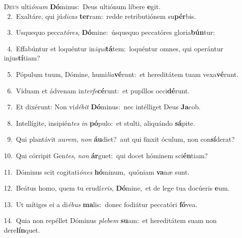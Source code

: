 \lettrine{\initial\textcolor{\initialcolor}{D}}{eus} ulti\-\textit{ó}\-\textit{num} \textbf{Dó}\-minus:~\star Deus ultiónum líbere \textbf{e}\-git.\\
{\numbfont\textcolor{\numbcolor}{~2.}}~Exaltáre, qui jú\-\textit{di}\-\textit{cas} \textbf{ter}\-ram:~\star redde retributiónem su\-\textbf{pér}\-bis.\par
{\numbfont\textcolor{\numbcolor}{~3.}}~Usquequo pecca\-\textit{tó}\-\textit{res}, \textbf{Dó}\-mine:~\star úsquequo peccatóres gloria\-\textbf{bún}\-tur:\par
{\numbfont\textcolor{\numbcolor}{~4.}}~Effabúntur et loquéntur in\-\textit{i}\-\textit{qui}\textbf{tá}tem:~\star loquéntur omnes, qui operántur injus\-\textbf{tí}\-tiam?\par
{\numbfont\textcolor{\numbcolor}{~5.}}~Pópulum tuum, Dómine, humi\-\textit{li}\-\textit{a}\textbf{vé}runt:~\star et hereditátem tuam vexa\-\textbf{vé}\-runt.\par
{\numbfont\textcolor{\numbcolor}{~6.}}~Víduam et ádvenam in\-\textit{ter}\-\textit{fe}\textbf{cé}runt:~\star et pupíllos occi\-\textbf{dé}\-runt.\par
{\numbfont\textcolor{\numbcolor}{~7.}}~Et dixérunt: Non vi\-\textit{dé}\-\textit{bit} \textbf{Dó}\-minus:~\star nec intélliget Deus \textbf{Ja}\-cob.\par
{\numbfont\textcolor{\numbcolor}{~8.}}~Intellígite, insipién\textit{tes} \textit{in} \textbf{pó}\-pulo:~\star et stulti, aliquándo \textbf{sá}\-pite.\par
{\numbfont\textcolor{\numbcolor}{~9.}}~Qui plantávit au\-\textit{rem}\-, \textit{non} \textbf{áu}\-diet?~\star aut qui finxit óculum, non con\-\textbf{sí}\-derat?\par
{\numbfont\textcolor{\numbcolor}{10.}}~Qui córripit Gen\-\textit{tes}\-, \textit{non} \textbf{ár}\-guet:~\star qui docet hóminem sci\-\textbf{én}\-tiam?\par
{\numbfont\textcolor{\numbcolor}{11.}}~Dóminus scit cogitati\-\textit{ó}\-\textit{nes} \textbf{hó}\-minum,~\star quóniam \textbf{va}\-næ sunt.\par
{\numbfont\textcolor{\numbcolor}{12.}}~Beátus homo, quem tu erudí\-\textit{e}\-\textit{ris}, \textbf{Dó}\-mine,~\star et de lege tua docúeris \textbf{e}\-um.\par
{\numbfont\textcolor{\numbcolor}{13.}}~Ut mítiges ei a di\-\textit{é}\-\textit{bus} \textbf{ma}\-lis:~\star donec fodiátur peccatóri \textbf{fó}\-vea.\par
{\numbfont\textcolor{\numbcolor}{14.}}~Quia non repéllet Dóminus \textit{ple}\-\textit{bem} \textbf{su}\-am:~\star et hereditátem suam non dere\-\textbf{lín}\-quet.\par
